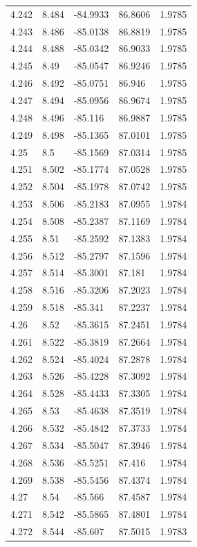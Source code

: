 \begin{tabular}{lllll}
4.242 & 8.484 & -84.9933 & 86.8606 & 1.9785 \\
4.243 & 8.486 & -85.0138 & 86.8819 & 1.9785 \\
4.244 & 8.488 & -85.0342 & 86.9033 & 1.9785 \\
4.245 & 8.49 & -85.0547 & 86.9246 & 1.9785 \\
4.246 & 8.492 & -85.0751 & 86.946 & 1.9785 \\
4.247 & 8.494 & -85.0956 & 86.9674 & 1.9785 \\
4.248 & 8.496 & -85.116 & 86.9887 & 1.9785 \\
4.249 & 8.498 & -85.1365 & 87.0101 & 1.9785 \\
4.25 & 8.5 & -85.1569 & 87.0314 & 1.9785 \\
4.251 & 8.502 & -85.1774 & 87.0528 & 1.9785 \\
4.252 & 8.504 & -85.1978 & 87.0742 & 1.9785 \\
4.253 & 8.506 & -85.2183 & 87.0955 & 1.9784 \\
4.254 & 8.508 & -85.2387 & 87.1169 & 1.9784 \\
4.255 & 8.51 & -85.2592 & 87.1383 & 1.9784 \\
4.256 & 8.512 & -85.2797 & 87.1596 & 1.9784 \\
4.257 & 8.514 & -85.3001 & 87.181 & 1.9784 \\
4.258 & 8.516 & -85.3206 & 87.2023 & 1.9784 \\
4.259 & 8.518 & -85.341 & 87.2237 & 1.9784 \\
4.26 & 8.52 & -85.3615 & 87.2451 & 1.9784 \\
4.261 & 8.522 & -85.3819 & 87.2664 & 1.9784 \\
4.262 & 8.524 & -85.4024 & 87.2878 & 1.9784 \\
4.263 & 8.526 & -85.4228 & 87.3092 & 1.9784 \\
4.264 & 8.528 & -85.4433 & 87.3305 & 1.9784 \\
4.265 & 8.53 & -85.4638 & 87.3519 & 1.9784 \\
4.266 & 8.532 & -85.4842 & 87.3733 & 1.9784 \\
4.267 & 8.534 & -85.5047 & 87.3946 & 1.9784 \\
4.268 & 8.536 & -85.5251 & 87.416 & 1.9784 \\
4.269 & 8.538 & -85.5456 & 87.4374 & 1.9784 \\
4.27 & 8.54 & -85.566 & 87.4587 & 1.9784 \\
4.271 & 8.542 & -85.5865 & 87.4801 & 1.9784 \\
4.272 & 8.544 & -85.607 & 87.5015 & 1.9783 \\

\end{tabular}

